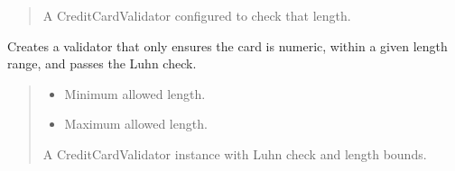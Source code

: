 \documentclass[letterpaper,10pt,english]{sphinxmanual}
\begin{document}
\begin{fulllineitems}
\begin{fulllineitems}
\begin{quote}
\begin{description}
\sphinxAtStartPar
A CreditCardValidator configured to check that length.

\end{description}\end{quote}

\end{fulllineitems}


\begin{fulllineitems}
\label{\detokenize{apache_commons_validator_python.routines:apache_commons_validator_python.routines.credit_card_validator.CreditCardValidator.generic_credit_card_validator_with_range}}
\pysigstartsignatures
{}
\pysigstopsignatures
\sphinxAtStartPar
Creates a validator that only ensures the card is numeric, within a given
length range, and passes the Luhn check.
\begin{quote}\begin{description}
\begin{itemize}
\item {} 
\sphinxAtStartPar
{} \textendash{} Minimum allowed length.

\item {} 
\sphinxAtStartPar
{} \textendash{} Maximum allowed length.

\end{itemize}

\sphinxAtStartPar
A CreditCardValidator instance with Luhn check and length bounds.

\end{description}\end{quote}


\end{fulllineitems}
\end{fulllineitems}
\end{document}
